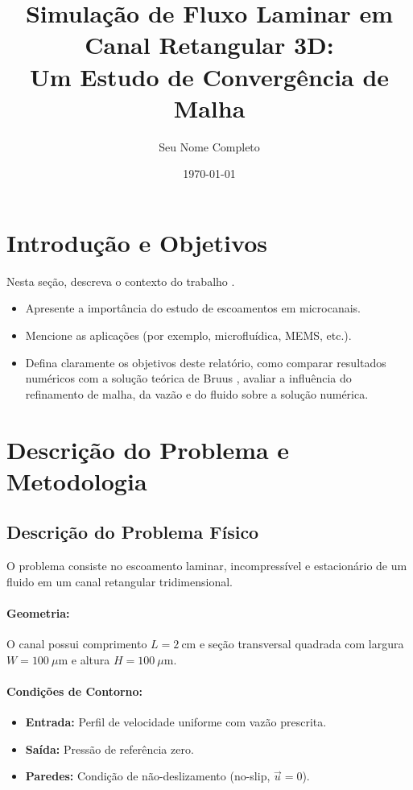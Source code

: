 \documentclass[12pt, a4paper]{article}
\title{Simulação de Fluxo Laminar em Canal Retangular 3D: \\ Um Estudo de Convergência de Malha}
\author{Seu Nome Completo}
\date{\today}
\begin{document}
\maketitle
\tableofcontents
\newpage

\section{Introdução e Objetivos}

Nesta seção, descreva o contexto do trabalho \cite{bruus}.  
\begin{itemize}
    \item Apresente a importância do estudo de escoamentos em microcanais.
    \item Mencione as aplicações (por exemplo, microfluídica, MEMS, etc.).
    \item Defina claramente os objetivos deste relatório, como comparar resultados numéricos com a solução teórica de Bruus \cite{bruus}, avaliar a influência do refinamento de malha, da vazão e do fluido sobre a solução numérica.
\end{itemize}

\section{Descrição do Problema e Metodologia}

\subsection{Descrição do Problema Físico}

O problema consiste no escoamento laminar, incompressível e estacionário de um fluido em um canal retangular tridimensional.

\paragraph{Geometria:} O canal possui comprimento \(L = 2\ \mathrm{cm}\) e seção transversal quadrada com largura \(W = 100\ \mu\mathrm{m}\) e altura \(H = 100\ \mu\mathrm{m}\).

\paragraph{Condições de Contorno:}
\begin{itemize}
    \item \textbf{Entrada:} Perfil de velocidade uniforme com vazão prescrita.
    \item \textbf{Saída:} Pressão de referência zero.
    \item \textbf{Paredes:} Condição de não-deslizamento (no-slip, \(\vec{u} = 0\)).
\end{itemize}
\end{document}
